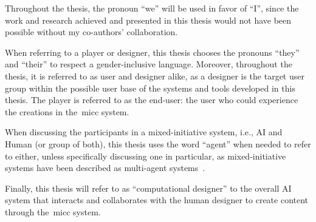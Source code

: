 Throughout the thesis, the pronoun ``we'' will be used in favor of ``I'', since the work and research achieved and presented in this thesis would not have been possible without my co-authors' collaboration. 

\sloppy
When referring to a player or designer, this thesis chooses the pronouns ``they'' and ``their'' to respect a gender-inclusive language. Moreover, throughout the thesis, it is referred to as user and designer alike, as a designer is the target user group within the possible user base of the systems and tools developed in this thesis. The player is referred to as the end-user: the user who could experience the creations in the~\acrlong{micc} system.


When discussing the participants in a mixed-initiative system, i.e., AI and Human (or group of both), this thesis uses the word ``agent'' when needed to refer to either, unless specifically discussing one in particular, as mixed-initiative systems have been described as multi-agent systems~\cite{allen_mixed-initiative_1999}.

Finally, this thesis will refer to as ``computational designer'' to the overall AI system that interacts and collaborates with the human designer to create content through the~\acrshort{micc} system.




